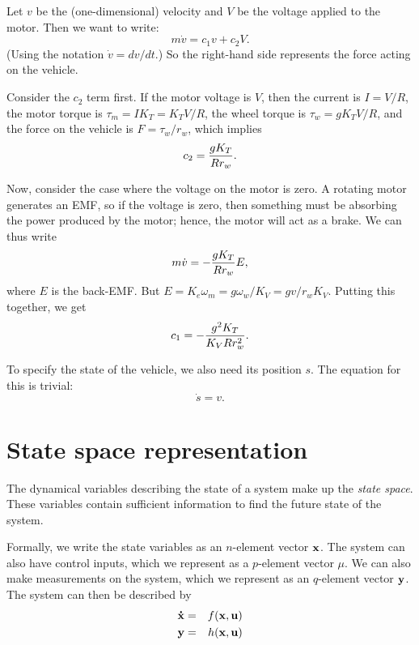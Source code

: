 \documentclass[12pt]{article}
\begin{document}
Let $v$ be the (one-dimensional) velocity and $V$ be the voltage
applied to the motor.  Then we want to write:
\begin{equation}
  m \dot v = c_1 v + c_2 V.
\end{equation}
(Using the notation $\dot v = dv/dt$.)
So the right-hand side represents the force acting on the vehicle.

Consider the $c_2$ term first.  If the motor voltage is $V$, then the
current is $I = V/R$, the motor torque is $\tau_m = IK_T = K_T V/R$,
the wheel torque is $\tau_w = gK_T V/R$, and the force on the vehicle
is $F = \tau_w / r_w$, which implies
\begin{equation}
  c_2 = {g K_T \over R r_w}.
\end{equation}

Now, consider the case where the voltage on the motor is zero.
A rotating motor generates an EMF, so if the voltage is zero, then
something must be absorbing the power produced by the motor; hence,
the motor will act as a brake.  We can thus write
\begin{equation}
  m \dot v = - { g K_T \over R r_w } E,
\end{equation}
where $E$ is the back-EMF.  But $E = K_e\omega_m = g \omega_w / K_V =
g v / r_w K_V$.  Putting this together, we get
\begin{equation}
  c_1 = - { g^2 K_T \over K_V R r_w^2}.
\end{equation}

To specify the state of the vehicle, we also need its position $s$.
The equation for this is trivial:
\begin{equation}
  \dot s = v.
\end{equation}

\section{State space representation}

The dynamical variables describing the state of a system make up the
\emph{state space}.  These variables contain sufficient information
to find the future state of the system.

Formally, we write the state variables as an $n$-element vector ${\bf x}$.
The system can also have control inputs, which we represent
as a $p$-element vector $\mu$.  We can also make measurements
on the system, which we represent as an $q$-element vector ${\bf y}$.
The system can then be described by
\begin{eqnarray}
  {\bf\dot x} &=& f({\bf x}, {\bf u})\\
  {\bf y} &=& h({\bf x}, {\bf u})
\end{eqnarray}
\end{document}
